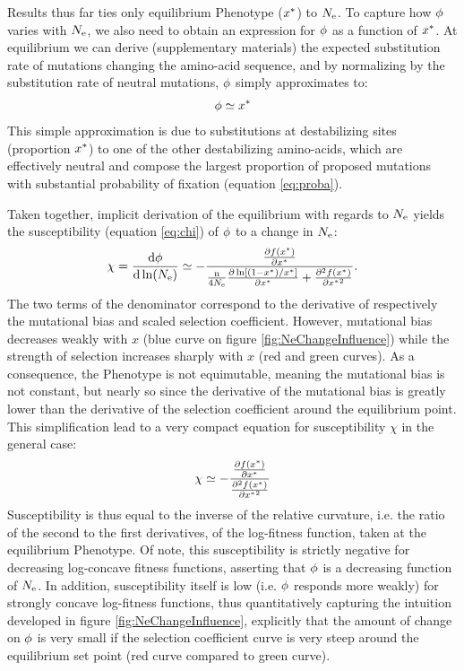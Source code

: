 Results thus far ties only equilibrium \gls{Phenotype} ($x^{*}$) to $N_{\mathrm{e}}$.
To capture how $\phi$ varies with $N_{\mathrm{e}}$, we also need to obtain an expression for $\phi$ as a function of $x^{*}$.
At equilibrium we can derive (supplementary materials) the expected \gls{substitution} rate of mutations changing the amino-acid sequence, and by normalizing by the \gls{substitution} rate of \gls{neutral} mutations, $\phi$ simply approximates to:
\begin{gather}
    \avgpfix \simeq x\eq \label{eq:dnds}
\end{gather}
This simple approximation is due to \glspl{substitution} at destabilizing sites (proportion $x^{*}$) to one of the other destabilizing amino-acids, which are effectively \gls{neutral} and compose the largest proportion of proposed mutations with substantial probability of fixation (equation \ref{eq:proba}).

Taken together, implicit derivation of the equilibrium with regards to $N_{\mathrm{e}}$ yields the susceptibility (equation \ref{eq:chi}) of $\phi$ to a change in $N_{\mathrm{e}}$:
\begin{gather}
    \chi = \frac{ \mathrm{d} \phi}{\mathrm{d} \ln (N_{\mathrm{e}})} \simeq - \frac{\frac{ \partial f (x^{*}) }{\partial {x^{*}}}}{\frac{\text{n}}{4 N_{\mathrm{e}}} \frac{\partial \ln [ (1 - x^{*}) / x^{*} ]}{\partial x^{*} } + \frac{ \partial^2 f (x^{*}) }{\partial {x^{*}}^2}}.
\end{gather}
The two terms of the denominator correspond to the derivative of respectively the mutational bias and scaled selection coefficient.
However, mutational bias decreases weakly with $x$ (blue curve on figure \ref{fig:NeChangeInfluence}) while the strength of selection increases sharply with $x$ (red and green curves).
As a consequence, the \gls{Phenotype} is not equimutable, meaning the mutational bias is not constant, but nearly so since the derivative of the mutational bias is greatly lower than the derivative of the selection coefficient around the equilibrium point.
This simplification lead to a very compact equation for susceptibility $\chi$ in the general case:
\begin{gather}
    \chi \simeq - \frac{\frac{ \partial f (x^{*}) }{\partial {x^{*}}}}{\frac{ \partial^2 f (x^{*}) }{\partial {x^{*}}^2}}
\end{gather}
Susceptibility is thus equal to the inverse of the relative curvature, i.e. the ratio of the second to the first derivatives, of the log-fitness function, taken at the equilibrium \gls{Phenotype}.
Of note, this susceptibility is strictly negative for decreasing log-concave fitness functions, asserting that $\phi$ is a decreasing function of $N_{\mathrm{e}}$.
In addition, susceptibility itself is low (i.e. $\phi$ responds more weakly) for strongly concave log-fitness functions, thus quantitatively capturing the intuition developed in figure \ref{fig:NeChangeInfluence}, explicitly that the amount of change on $\phi$ is very small if the selection coefficient curve is very steep around the equilibrium set point (red curve compared to green curve).

